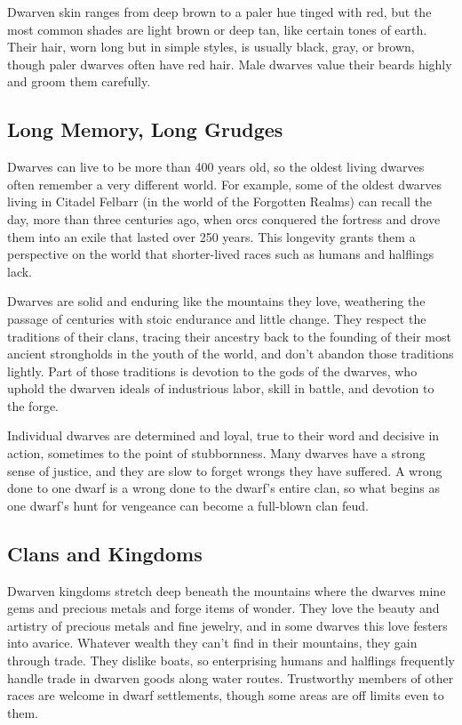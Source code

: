 Dwarven skin ranges from deep brown to a paler hue tinged with red, but the most common shades are light brown or deep tan, like certain tones of earth. Their hair, worn long but in simple styles, is usually black, gray, or brown, though paler dwarves often have red hair. Male dwarves value their beards highly and groom them carefully.

\subsection{Long Memory, Long Grudges}
Dwarves can live to be more than 400 years old, so the oldest living dwarves often remember a very different world. For example, some of the oldest dwarves living in Citadel Felbarr (in the world of the Forgotten Realms) can recall the day, more than three centuries ago, when orcs conquered the fortress and drove them into an exile that lasted over 250 years. This longevity grants them a perspective on the world that shorter-lived races such as humans and halflings lack.

Dwarves are solid and enduring like the mountains they love, weathering the passage of centuries with stoic endurance and little change. They respect the traditions of their clans, tracing their ancestry back to the founding of their most ancient strongholds in the youth of the world, and don’t abandon those traditions lightly. Part of those traditions is devotion to the gods of the dwarves, who uphold the dwarven ideals of industrious labor, skill in battle, and devotion to the forge.

Individual dwarves are determined and loyal, true to their word and decisive in action, sometimes to the point of stubbornness. Many dwarves have a strong sense of justice, and they are slow to forget wrongs they have suffered. A wrong done to one dwarf is a wrong done to the dwarf’s entire clan, so what begins as one dwarf’s hunt for vengeance can become a full-blown clan feud.

\subsection{Clans and Kingdoms}
Dwarven kingdoms stretch deep beneath the mountains where the dwarves mine gems and precious metals and forge items of wonder. They love the beauty and artistry of precious metals and fine jewelry, and in some dwarves this love festers into avarice. Whatever wealth they can’t find in their mountains, they gain through trade. They dislike boats, so enterprising humans and halflings frequently handle trade in dwarven goods along water routes. Trustworthy members of other races are welcome in dwarf settlements, though some areas are off limits even to them.

